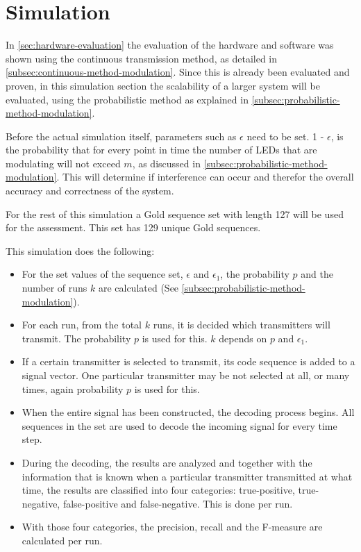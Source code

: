 
\section{Simulation}
\label{sec:simulation-evaluation}

In \autoref{sec:hardware-evaluation} the evaluation of the hardware and software was shown using the continuous transmission method, as detailed in \autoref{subsec:continuous-method-modulation}.
Since this is already been evaluated and proven, in this simulation section the scalability of a larger system will be evaluated, using the probabilistic method as explained in \autoref{subsec:probabilistic-method-modulation}.


Before the actual simulation itself, parameters such as $\epsilon$ need to be set.
1 - $\epsilon$, is the probability that for every point in time the number of LEDs that are modulating will not exceed $m$, as discussed in \autoref{subsec:probabilistic-method-modulation}.
This will determine if interference can occur and therefor the overall accuracy and correctness of the system.

For the rest of this simulation a Gold sequence set with length 127 will be used for the assessment.
This set has 129 unique Gold sequences.

This simulation does the following: 

\begin{itemize}

	\item For the set values of the sequence set, $\epsilon$ and $\epsilon_1$, the probability $p$ and the number of runs $k$ are calculated (See \autoref{subsec:probabilistic-method-modulation}).

	\item For each run, from the total $k$ runs, it is decided which transmitters will transmit. The probability $p$ is used for this. $k$ depends on $p$ and $\epsilon_1$.

	\item If a certain transmitter is selected to transmit, its code sequence is added to a signal vector. One particular transmitter may be not selected at all, or many times, again probability $p$ is used for this.

	\item When the entire signal has been constructed, the decoding process begins. All sequences in the set are used to decode the incoming signal for every time step.

	\item During the decoding, the results are analyzed and together with the information that is known when a particular transmitter transmitted at what time, the results are classified into four categories: true-positive, true-negative, false-positive and false-negative. This is done per run.

	\item With those four categories, the precision, recall and the F-measure are calculated per run.



\end{itemize}





